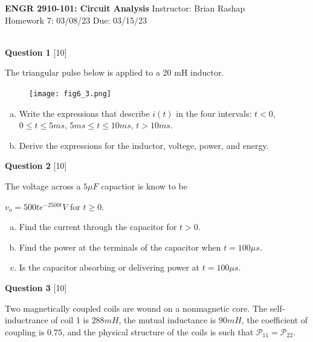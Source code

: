 \documentclass[12pt]{article}
\begin{document}
\begin{center}
\hfil
{\large\bf {ENGR 2910-101: Circuit Analysis}}
\hfill Instructor: Brian Rashap\\
Homework 7: 03/08/23 \hfill Due: 03/15/23\\
\hrulefill\\
\end{center}

{\bf Question 1} [10] %

The triangular pulse below is applied to a 20 mH inductor.

\begin{figure}[h!]
\begin{center}
 \texttt{[image: fig6\_3.png]}
\end{center}
\end{figure}

\begin{enumerate}[(a)]
\item Write the expressions that describe $i(t)$ in the four intervals: \newline $t <0$, $0 \leq t \leq 5ms$, $5ms \leq t \leq 10ms$, $t> 10ms$.
\item Derive the expressions for the inductor, voltege, power, and energy. 
\end{enumerate}


\vspace{0.1in}

{\bf Question 2} [10] %

The voltage across a $5 \mu F$ capactior is know to be \newline

\begin{center}
$v_o = 500 t e^{-2500t} V$ for $t \geq 0$.
\end{center}

\begin{enumerate}[(a)]
\item Find the current through the capacitor for $t > 0$.
\item Find the power at the terminals of the capacitor when $t = 100 \mu s$.
\item Is the capacitor absorbing or delivering power at $t = 100 \mu s$.
\end{enumerate}

{\bf Question 3} [10] %

Two magnetically coupled coils are wound on a nonmagnetic core. The self-inductrance of coil 1 is $288 mH$, the mutual inductance is $90mH$, the coefficient of coupling is $0.75$, and the physical structure of the coils is such that $\mathcal{P}_{11} = \mathcal{P}_{22}$.
\end{document}
